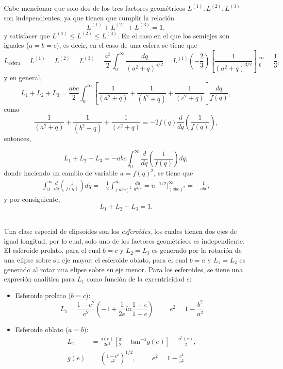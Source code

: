 Cabe mencionar que solo dos de los tres factores geométricos $L^{(1)},L^{(2)},L^{(3)}$ son independientes, ya que tienen que cumplir la relación 
\begin{equation}
    L^{(1)}+L^{(2)}+L^{(3)}=1,
\end{equation}
y satisfacer que $L^{(1)}\leq L^{(2)}\leq L^{(3)}$. En el caso en el que los semiejes son iguales ($a=b=c$), es decir, en el caso de una esfera se tiene que
\begin{equation}
    L_{\mbox{esfera}}=L^{(1)}=L^{(2)}=L^{(3)}=\frac{a^3}{2}\int_0^{\infty}\frac{dq}{(a^2+q)^{5/2}}=L^{(1)}\left(-\frac{2}{3}\right)\left[\frac{1}{(a^2+q)^{3/2}}\right]\Bigg |_0^{\infty}=\frac{1}{3},
\end{equation}
y en general, 
\begin{equation}
    L_1+L_2+L_3=\frac{abc}{2}\int_0^{\infty}\left[\frac{1}{(a^2+q)}+\frac{1}{(b^2+q)}+\frac{1}{(c^2+q)}\right]\frac{dq}{f(q)},
\end{equation}
como
$$\frac{1}{(a^2+q)}+\frac{1}{(b^2+q)}+\frac{1}{(c^2+q)}=-2 f(q)\frac{d}{dq}\left(\frac{1}{f(q)}\right),$$
entonces,

$$L_1+L_2+L_3=-abc\int_0^{\infty}\frac{d}{dq}\left(\frac{1}{f(q)}\right)dq,$$
donde haciendo un cambio de variable $u=f(q)^2$, se tiene que
\begin{align*}
    \int_0^{\infty}\frac{d}{dq}\left(\frac{1}{f(q)}\right)dq=-\frac{1}{2}\int_{(abc)^2}^{\infty}\frac{du}{u^{3/2}}=u^{-1/2}\Big|_{(abc)^2}^{\infty}=-\frac{1}{abc},
\end{align*}
y por consiguiente, 
\begin{equation}
    L_1+L_2+L_3=1.
\end{equation}

\\

Una clase especial de elipsoides son los \textit{esferoides}, los cuales tienen dos ejes de igual longitud, por lo cual, solo uno de los factores geométricos es independiente. El esferoide prolato, para el cual $b=c$ y $L_2=L_3$ es generado por la rotación de una elipse sobre su eje mayor; el esferoide oblato, para el cual $b=a$ y $L_1=L_2$ es generado al rotar una elipse sobre su eje menor. Para los esferoides, se tiene una expresión analítica para $L_1$ como función de la excentricidad $e$:
\begin{itemize}
    \item Esferoide prolato ($b=c$):
    \begin{equation}
        L_1=\frac{1-e^2}{e^2}\left(-1+\frac{1}{2e}ln\frac{1+e}{1-e}\right)\hspace{1cm}e^2=1-\frac{b^2}{a^2}
    \end{equation}
    \item Esferoide oblato ($a=b$):
    \begin{align}
        L_1&=\frac{g(e)}{2e^2}\left[\frac{\pi}{2}-\mbox{tan}^{-1}g(e)\right]-\frac{g^2(e)}{2},\\
        g(e)&=\left(\frac{1-e^2}{e^2}\right)^{1/2},\hspace{1cm}e^2=1-\frac{c^2}{a^2}
    \end{align}
\end{itemize}

